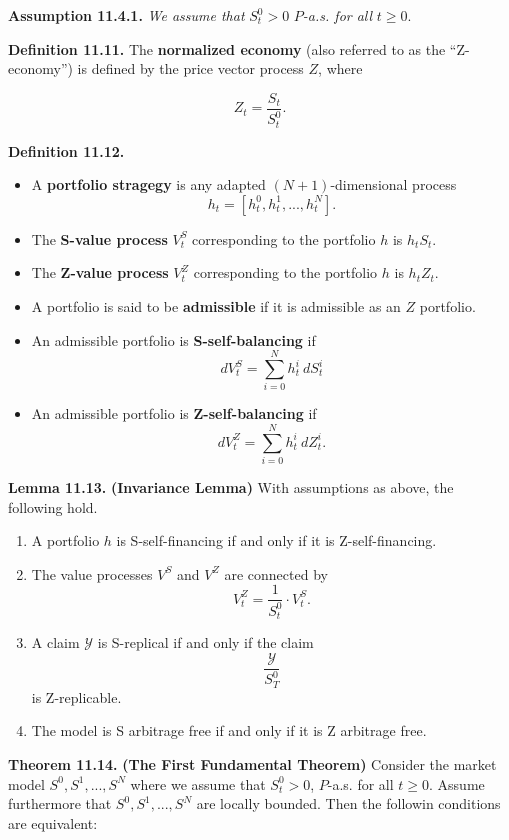\documentclass[
]{article}
\providecommand{\tightlist}{%
  \setlength{\itemsep}{0pt}\setlength{\parskip}{0pt}}
\begin{document}
\textbf{Assumption 11.4.1.} \emph{We assume that }\(S_t^0>0\)
\(P\)\emph{-a.s. for all }\(t\ge 0\).

\textbf{Definition 11.11.} The \textbf{normalized economy} (also
referred to as the ``Z-economy'') is defined by the price vector process
\(Z\), where

\[
Z_t=\frac{S_t}{S_t^0}.
\]

\textbf{Definition 11.12.}

\begin{itemize}
\tightlist
\item
  A \textbf{portfolio stragegy} is any adapted \((N+1)\)-dimensional
  process \[
    h_t=[h_t^0,h_t^1,...,h_t^N].
    \]
\item
  The \textbf{S-value process} \(V_t^S\) corresponding to the portfolio
  \(h\) is \(h_tS_t\).
\item
  The \textbf{Z-value process} \(V_t^Z\) corresponding to the portfolio
  \(h\) is \(h_tZ_t\).
\item
  A portfolio is said to be \textbf{admissible} if it is admissible as
  an \(Z\) portfolio.
\item
  An admissible portfolio is \textbf{S-self-balancing} if \[
    dV_t^S=\sum_{i=0}^Nh_t^i\ dS_t^i
    \]
\item
  An admissible portfolio is \textbf{Z-self-balancing} if \[
    dV_t^Z=\sum_{i=0}^Nh_t^i\ dZ_t^i.
    \]
\end{itemize}

\textbf{Lemma 11.13.} \textbf{(Invariance Lemma)} With assumptions as
above, the following hold.

\begin{enumerate}
\def\labelenumi{\roman{enumi}.}
\tightlist
\item
  A portfolio \(h\) is S-self-financing if and only if it is
  Z-self-financing.
\item
  The value processes \(V^S\) and \(V^Z\) are connected by \[
    V_t^Z=\frac{1}{S_t^0}\cdot V_t^S.
    \]
\item
  A claim \(\mathcal{Y}\) is S-replical if and only if the claim \[
    \frac{\mathcal{Y}}{S_T^0}
    \] is Z-replicable.
\item
  The model is S arbitrage free if and only if it is Z arbitrage free.
\end{enumerate}

\textbf{Theorem 11.14.} \textbf{(The First Fundamental Theorem)}
Consider the market model \(S^0,S^1,...,S^N\) where we assume that
\(S^0_t>0\), \(P\)-a.s. for all \(t\ge 0\). Assume furthermore that
\(S^0,S^1,...,S^N\) are locally bounded. Then the followin conditions
are equivalent:
\end{document}
